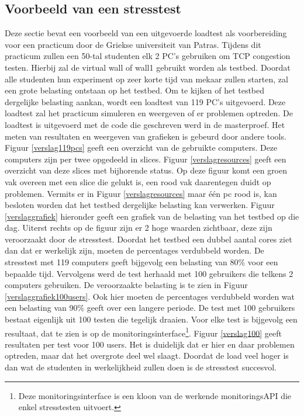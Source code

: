 \subsection{Voorbeeld van een stresstest}
\npar
Deze sectie bevat een voorbeeld van een uitgevoerde loadtest als voorbereiding voor een practicum door de Griekse universiteit van Patras. Tijdens dit practicum zullen een 50-tal studenten elk 2 PC's gebruiken om TCP congestion testen. Hierbij zal de virtual wall of wall1 gebruikt worden als testbed. Doordat alle studenten hun experiment op zeer korte tijd van mekaar zullen starten, zal een grote belasting ontstaan op het testbed. Om te kijken of het testbed dergelijke belasting aankan, wordt een loadtest van 119 PC's uitgevoerd. Deze loadtest zal het practicum simuleren en weergeven of er problemen optreden. De loadtest is uitgevoerd met de code die geschreven werd in de masterproef. Het meten van resultaten en weergeven van grafieken is gebeurd door andere tools.
\npar
Figuur \ref{verslag119pcs} geeft een overzicht van de gebruikte computers. Deze computers zijn per twee opgedeeld in slices. Figuur \ref{verslagresources} geeft een overzicht van deze slices met bijhorende status. Op deze figuur komt een groen vak overeen met een slice die gelukt is, een rood vak daarentegen duidt op problemen.
\npar
Vermits er in Figuur \ref{verslagresources} maar \'e\'en pc rood is, kan besloten worden dat het testbed dergelijke belasting kan verwerken. Figuur \ref{verslaggrafiek} hieronder geeft een grafiek van de belasting van het testbed op die dag. Uiterst rechts op de figuur zijn er 2 hoge waarden zichtbaar, deze zijn veroorzaakt door de stresstest. Doordat het testbed een dubbel aantal cores ziet dan dat er werkelijk zijn, moeten de percentages verdubbeld worden. De stresstest met 119 computers geeft bijgevolg een belasting van 80\% voor een bepaalde tijd.
\clearpage
\npar
Vervolgens werd de test herhaald met 100 gebruikers die telkens 2 computers gebruiken. De veroorzaakte belasting is te zien in Figuur \ref{verslaggrafiek100users}. Ook hier moeten de percentages verdubbeld worden wat een belasting van 90\% geeft over een langere periode.
\npar
De test met 100 gebruikers bestaat eigenlijk uit 100 testen die tegelijk draaien. Voor elke test is bijgevolg een resultaat, dat te zien is op de monitoringsinterface\footnote{Deze monitoringsinterface is een kloon van de werkende monitoringsAPI die enkel stresstesten uitvoert.}. Figuur \ref{verslag100} geeft resultaten per test voor 100 users. Het is duidelijk dat er hier en daar problemen optreden, maar dat het overgrote deel wel slaagt.
\npar
Doordat de load veel hoger is dan wat de studenten in werkelijkheid zullen doen is de stresstest succesvol. 
